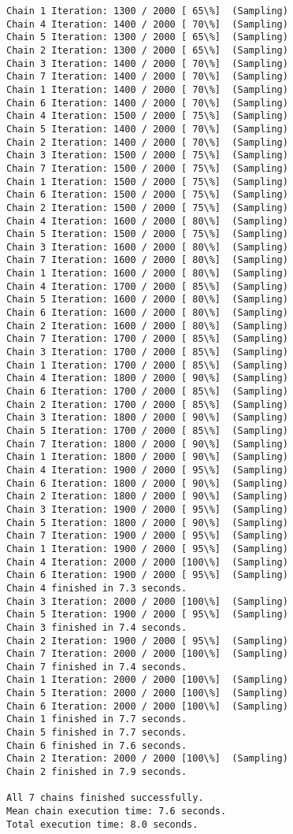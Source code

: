 \documentclass[11pt]{article}
\begin{document}
\begin{Verbatim}[commandchars=\\\{\}]
Chain 1 Iteration: 1300 / 2000 [ 65\%]  (Sampling)
Chain 4 Iteration: 1400 / 2000 [ 70\%]  (Sampling)
Chain 5 Iteration: 1300 / 2000 [ 65\%]  (Sampling)
Chain 2 Iteration: 1300 / 2000 [ 65\%]  (Sampling)
Chain 3 Iteration: 1400 / 2000 [ 70\%]  (Sampling)
Chain 7 Iteration: 1400 / 2000 [ 70\%]  (Sampling)
Chain 1 Iteration: 1400 / 2000 [ 70\%]  (Sampling)
Chain 6 Iteration: 1400 / 2000 [ 70\%]  (Sampling)
Chain 4 Iteration: 1500 / 2000 [ 75\%]  (Sampling)
Chain 5 Iteration: 1400 / 2000 [ 70\%]  (Sampling)
Chain 2 Iteration: 1400 / 2000 [ 70\%]  (Sampling)
Chain 3 Iteration: 1500 / 2000 [ 75\%]  (Sampling)
Chain 7 Iteration: 1500 / 2000 [ 75\%]  (Sampling)
Chain 1 Iteration: 1500 / 2000 [ 75\%]  (Sampling)
Chain 6 Iteration: 1500 / 2000 [ 75\%]  (Sampling)
Chain 2 Iteration: 1500 / 2000 [ 75\%]  (Sampling)
Chain 4 Iteration: 1600 / 2000 [ 80\%]  (Sampling)
Chain 5 Iteration: 1500 / 2000 [ 75\%]  (Sampling)
Chain 3 Iteration: 1600 / 2000 [ 80\%]  (Sampling)
Chain 7 Iteration: 1600 / 2000 [ 80\%]  (Sampling)
Chain 1 Iteration: 1600 / 2000 [ 80\%]  (Sampling)
Chain 4 Iteration: 1700 / 2000 [ 85\%]  (Sampling)
Chain 5 Iteration: 1600 / 2000 [ 80\%]  (Sampling)
Chain 6 Iteration: 1600 / 2000 [ 80\%]  (Sampling)
Chain 2 Iteration: 1600 / 2000 [ 80\%]  (Sampling)
Chain 7 Iteration: 1700 / 2000 [ 85\%]  (Sampling)
Chain 3 Iteration: 1700 / 2000 [ 85\%]  (Sampling)
Chain 1 Iteration: 1700 / 2000 [ 85\%]  (Sampling)
Chain 4 Iteration: 1800 / 2000 [ 90\%]  (Sampling)
Chain 6 Iteration: 1700 / 2000 [ 85\%]  (Sampling)
Chain 2 Iteration: 1700 / 2000 [ 85\%]  (Sampling)
Chain 3 Iteration: 1800 / 2000 [ 90\%]  (Sampling)
Chain 5 Iteration: 1700 / 2000 [ 85\%]  (Sampling)
Chain 7 Iteration: 1800 / 2000 [ 90\%]  (Sampling)
Chain 1 Iteration: 1800 / 2000 [ 90\%]  (Sampling)
Chain 4 Iteration: 1900 / 2000 [ 95\%]  (Sampling)
Chain 6 Iteration: 1800 / 2000 [ 90\%]  (Sampling)
Chain 2 Iteration: 1800 / 2000 [ 90\%]  (Sampling)
Chain 3 Iteration: 1900 / 2000 [ 95\%]  (Sampling)
Chain 5 Iteration: 1800 / 2000 [ 90\%]  (Sampling)
Chain 7 Iteration: 1900 / 2000 [ 95\%]  (Sampling)
Chain 1 Iteration: 1900 / 2000 [ 95\%]  (Sampling)
Chain 4 Iteration: 2000 / 2000 [100\%]  (Sampling)
Chain 6 Iteration: 1900 / 2000 [ 95\%]  (Sampling)
Chain 4 finished in 7.3 seconds.
Chain 3 Iteration: 2000 / 2000 [100\%]  (Sampling)
Chain 5 Iteration: 1900 / 2000 [ 95\%]  (Sampling)
Chain 3 finished in 7.4 seconds.
Chain 2 Iteration: 1900 / 2000 [ 95\%]  (Sampling)
Chain 7 Iteration: 2000 / 2000 [100\%]  (Sampling)
Chain 7 finished in 7.4 seconds.
Chain 1 Iteration: 2000 / 2000 [100\%]  (Sampling)
Chain 5 Iteration: 2000 / 2000 [100\%]  (Sampling)
Chain 6 Iteration: 2000 / 2000 [100\%]  (Sampling)
Chain 1 finished in 7.7 seconds.
Chain 5 finished in 7.7 seconds.
Chain 6 finished in 7.6 seconds.
Chain 2 Iteration: 2000 / 2000 [100\%]  (Sampling)
Chain 2 finished in 7.9 seconds.

All 7 chains finished successfully.
Mean chain execution time: 7.6 seconds.
Total execution time: 8.0 seconds.

    \end{Verbatim}
\end{document}
